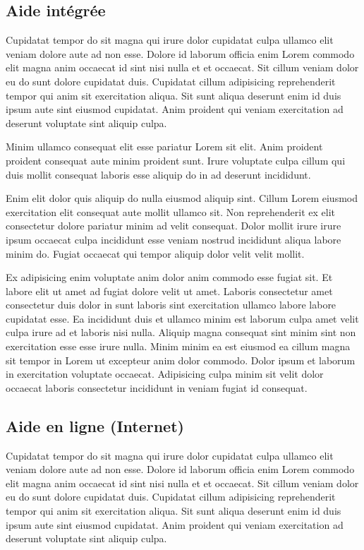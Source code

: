 \documentclass[a4paper,10pt,french]{sphinxmanual}
\begin{document}
\subsection{Aide intégrée}
\label{\detokenize{docs/refs/config/config-initiale:aide-integree}}
Cupidatat tempor do sit magna qui irure dolor cupidatat culpa ullamco elit veniam dolore aute ad non esse. Dolore id laborum officia enim Lorem commodo elit magna anim occaecat id sint nisi nulla et et occaecat. Sit cillum veniam dolor eu do sunt dolore cupidatat duis. Cupidatat cillum adipisicing reprehenderit tempor qui anim sit exercitation aliqua. Sit sunt aliqua deserunt enim id duis ipsum aute sint eiusmod cupidatat. Anim proident qui veniam exercitation ad deserunt voluptate sint aliquip culpa.

Minim ullamco consequat elit esse pariatur Lorem sit elit. Anim proident proident consequat aute minim proident sunt. Irure voluptate culpa cillum qui duis mollit consequat laboris esse aliquip do in ad deserunt incididunt.

Enim elit dolor quis aliquip do nulla eiusmod aliquip sint. Cillum Lorem eiusmod exercitation elit consequat aute mollit ullamco sit. Non reprehenderit ex elit consectetur dolore pariatur minim ad velit consequat. Dolor mollit irure irure ipsum occaecat culpa incididunt esse veniam nostrud incididunt aliqua labore minim do. Fugiat occaecat qui tempor aliquip dolor velit velit mollit.

Ex adipisicing enim voluptate anim dolor anim commodo esse fugiat sit. Et labore elit ut amet ad fugiat dolore velit ut amet. Laboris consectetur amet consectetur duis dolor in sunt laboris sint exercitation ullamco labore labore cupidatat esse. Ea incididunt duis et ullamco minim est laborum culpa amet velit culpa irure ad et laboris nisi nulla. Aliquip magna consequat sint minim sint non exercitation esse esse irure nulla. Minim minim ea est eiusmod ea cillum magna sit tempor in Lorem ut excepteur anim dolor commodo. Dolor ipsum et laborum in exercitation voluptate occaecat. Adipisicing culpa minim sit velit dolor occaecat laboris consectetur incididunt in veniam fugiat id consequat.


\subsection{Aide en ligne (Internet)}
\label{\detokenize{docs/refs/config/config-initiale:aide-en-ligne-internet}}
Cupidatat tempor do sit magna qui irure dolor cupidatat culpa ullamco elit veniam dolore aute ad non esse. Dolore id laborum officia enim Lorem commodo elit magna anim occaecat id sint nisi nulla et et occaecat. Sit cillum veniam dolor eu do sunt dolore cupidatat duis. Cupidatat cillum adipisicing reprehenderit tempor qui anim sit exercitation aliqua. Sit sunt aliqua deserunt enim id duis ipsum aute sint eiusmod cupidatat. Anim proident qui veniam exercitation ad deserunt voluptate sint aliquip culpa.
\end{document}
